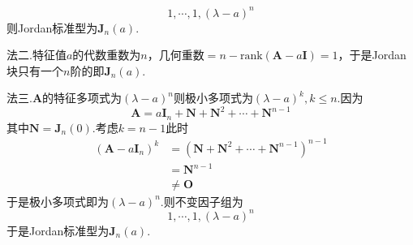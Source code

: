 {\begin{solution}
        \[
            1,\cdots,1,\left(\lambda-a\right)^n
        \]则Jordan标准型为$\bm{J}_n\left(a\right).$

        法二.特征值$a$的代数重数为$n$，几何重数$=n-\mathrm{rank}\left(
            \bm{A}-a\bm{I}
            \right)=1$，于是Jordan块只有一个$n$阶的即$\bm{J}_n\left(a\right)$.

        法三.$\bm{A}$的特征多项式为$\left(
            \lambda-a
            \right)^n$则极小多项式为$\left(
            \lambda-a
            \right)^k,k\leqslant n.$因为\[
            \bm{A}=a\bm{I}_n+\bm{N}+\bm{N}^2+\cdots+\bm{N}^{n-1}
        \]其中$\bm{N}=\bm{J}_n\left(0\right).$考虑$k=n-1$此时\begin{align*}
            \left(
            \bm{A}-a\bm{I}_n
            \right)^k & =\left(
            \bm{N}+\bm{N}^2+\cdots+\bm{N}^{n-1}
            \right)^{n-1}             \\
                      & =\bm{N}^{n-1} \\
                      & \neq \bm{O}
        \end{align*}于是极小多项式即为$\left(
            \lambda-a
            \right)^n$.则不变因子组为\[
            1,\cdots,1,\left(\lambda-a\right)^n\]于是Jordan标准型为$\bm{J}_n\left(a\right)$.
    \end{solution}
}
